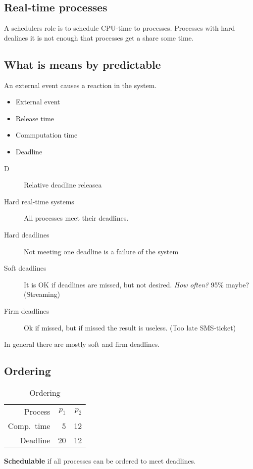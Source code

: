 \documentclass[course, english]{Notes}
\begin{document}
\subsection{Real-time processes}
A schedulers role is to schedule CPU-time to processes.
Processes with hard dealines it is not enough that processes get a share some time.\\

\subsection{What is means by predictable}
An external event causes a reaction in the system.
\begin{itemize}
	\item External event
	\item Release time
	\item Commputation time
	\item Deadline
\end{itemize}
\begin{description}
	\item[D] Relative deadline releasea
	\item[Hard real-time systems] All processes meet their deadlines. 
	\item[Hard deadlines] Not meeting one deadline is a failure of the system
	\item[Soft deadlines] It is OK if deadlines are missed, but not desired.
		\textit{How often?} 95\% maybe? (Streaming)
	\item[Firm deadlines] Ok if missed, but if missed the result is useless.
		(Too late SMS-ticket)
\end{description}
In general there are mostly soft and firm deadlines.

\subsection{Ordering}
\begin{table}[H]
	\centering
	\begin{tabular}{r r r}
	Process & $p_1$ & $p_2$ \\
	Comp.\ time & 5 & 12 \\
	Deadline & 20 & 12

	\end{tabular}
	\caption{Ordering}
\label{tab:ordering}
\end{table}

\textbf{Schedulable} if all processes can be ordered to meet deadlines.
\end{document}
